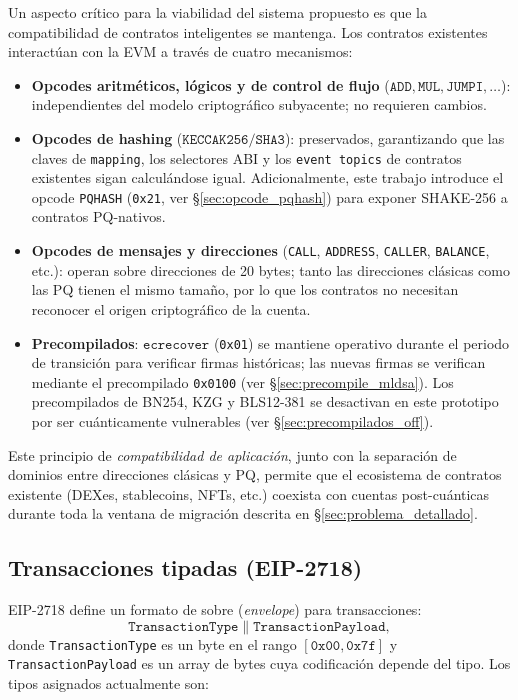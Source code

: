 Un aspecto crítico para la viabilidad del sistema propuesto es que la compatibilidad de contratos inteligentes se mantenga. Los contratos existentes interactúan con la EVM a través de cuatro mecanismos:

\begin{itemize}
  \item \textbf{Opcodes aritméticos, lógicos y de control de flujo} ($\texttt{ADD}, \texttt{MUL}, \texttt{JUMPI}, \ldots$): independientes del modelo criptográfico subyacente; no requieren cambios.
  \item \textbf{Opcodes de hashing} ($\texttt{KECCAK256}/\texttt{SHA3}$): preservados, garantizando que las claves de \texttt{mapping}, los selectores ABI y los \texttt{event topics} de contratos existentes sigan calculándose igual. Adicionalmente, este trabajo introduce el opcode \texttt{PQHASH} (\texttt{0x21}, ver \S\ref{sec:opcode_pqhash}) para exponer SHAKE-256 a contratos PQ-nativos.
  \item \textbf{Opcodes de mensajes y direcciones} (\texttt{CALL}, \texttt{ADDRESS}, \texttt{CALLER}, \texttt{BALANCE}, etc.): operan sobre direcciones de 20 bytes; tanto las direcciones clásicas como las PQ tienen el mismo tamaño, por lo que los contratos no necesitan reconocer el origen criptográfico de la cuenta.
  \item \textbf{Precompilados}: $\texttt{ecrecover}$ (\texttt{0x01}) se mantiene operativo durante el periodo de transición para verificar firmas históricas; las nuevas firmas se verifican mediante el precompilado \texttt{0x0100} (ver \S\ref{sec:precompile_mldsa}). Los precompilados de BN254, KZG y BLS12-381 se desactivan en este prototipo por ser cuánticamente vulnerables (ver \S\ref{sec:precompilados_off}).
\end{itemize}

Este principio de \emph{compatibilidad de aplicación}, junto con la separación de dominios entre direcciones clásicas y PQ, permite que el ecosistema de contratos existente (DEXes, stablecoins, NFTs, etc.) coexista con cuentas post-cuánticas durante toda la ventana de migración descrita en \S\ref{sec:problema_detallado}.

\subsection{Transacciones tipadas (EIP-2718)}

EIP-2718 \parencite{eip2718} define un formato de sobre (\emph{envelope}) para transacciones:
\begin{equation}
  \texttt{TransactionType} \| \texttt{TransactionPayload},
  \label{eq:eip2718}
\end{equation}
donde \texttt{TransactionType} es un byte en el rango $[\texttt{0x00}, \texttt{0x7f}]$ y \texttt{TransactionPayload} es un array de bytes cuya codificación depende del tipo. Los tipos asignados actualmente son:

